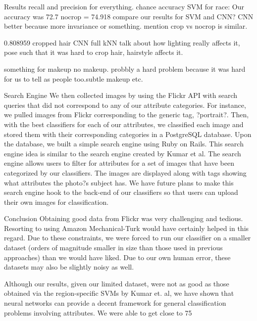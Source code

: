 \documentclass[letterpaper,10pt, twocolumn]{article}
\begin{document}
Results
recall and precision for everything. chance accuracy
SVM for race:
Our accuracy was 72.7%
nocrop = 74.918%
compare our results for SVM and CNN? CNN better because more invariance or something. mention crop vs nocrop is similar. 

0.808959 cropped hair CNN full 
kNN talk about how lighting really affects it, pose such that it was hard to crop hair, hairstyle affects it.

something for makeup no makeup. probbly a hard problem because it was hard for us to tell as people too.subtle makeup etc. 

Search Engine 
We then collected images by using the Flickr API with search queries that did not correspond to any of our attribute categories. For instance, we pulled images from Flickr corresponding to the generic tag, ?portrait?. Then, with the best classifiers for each of our attributes, we classified each image and stored them with their corresponding categories in a PostgreSQL database.
Upon the database, we built a simple search engine using Ruby on Rails. This search engine idea is similar to the search engine created by Kumar et al. The search engine allows users to filter for attributes for a set of images that have been categorized by our classifiers. The images are displayed along with tags showing what attributes the photo?s subject has.
We have future plans to make this search engine hook to the back-end of our classifiers so that users can upload their own images for classification. 

Conclusion
Obtaining good data from Flickr was very challenging and tedious. Resorting to using Amazon Mechanical-Turk would have certainly helped in this regard. Due to these constraints, we were forced to run our classifier on a smaller dataset (orders of magnitude smaller in size than those used in previous approaches) than we would have liked. Due to our own human error, these datasets may also be slightly noisy as well. 

Although our results, given our limited dataset, were not as good as those obtained via the region-specific SVMs by Kumar et. al, we have shown that neural networks can provide a decent framework for general classification problems involving attributes. We were able to get close to 75%
\end{document}

